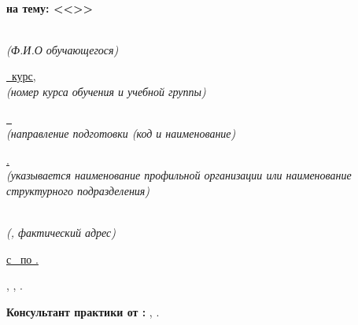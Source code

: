 {\centering%
	{\bfseries{} 
	\DocType\\
	на тему: <<\practiceTitle>>}\\

\intervalS

\normalfont\uline{\AuthorFull}\\%
\footnotesize{\textit{(Ф.И.О обучающегося)}}

\normalsize\uline{\course~курс, \group}\\%
\footnotesize{\textit{(номер курса обучения и учебной группы)}}

\normalsize\uline{\thesisSpecialtyCode~\thesisSpecialtyTitle}\\%
\footnotesize{\textit{(направление подготовки (код и наименование)}}

\normalsize\uline{ {\expandafter \Workplace}.}\\%
\footnotesize{\textit{(указывается наименование профильной организации или наименование структурного подразделения)}}

\normalsize\uline{\WorkplaceAddress}\\%
\footnotesize{\textit{(\SPbPUOfficialShort, фактический адрес)}}

\intervalS\normalfont%

\par}%


{ \uline{с \PracticeStartDate~по \PracticeEndDate.}}\par


{} {\expandafter \ulined \SupervisorFull, \SupervisorJob, \SupervisorDegree.} %



{\noindent \bfseries 
	Консультант практики от \SPbPUOfficialShort:
} 
{\noindent \expandafter \ulined \ConsultantExtraFull, \ConsultantExtraDegree}.%

